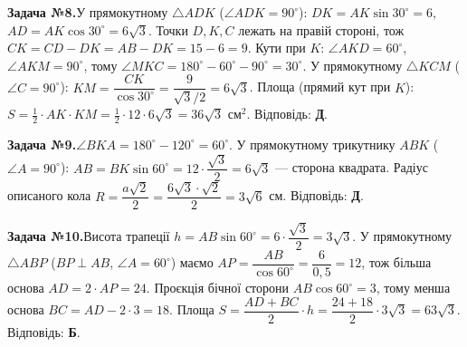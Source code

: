 \documentclass[12pt]{article}
\begin{document}
\par\vspace{0.3cm}\noindent\hypertarget{sol:8}{}
\begin{tcolorbox}[colback=titleBg!40, colframe=mainGreen!55, boxrule=0.4pt, arc=2pt, left=6pt, right=6pt, top=4pt, bottom=4pt, breakable]
\noindent\small\textbf{Задача №8.}\quad У прямокутному $\triangle ADK$ ($\angle ADK=90^\circ$): $DK=AK\sin30^\circ=6$, $AD=AK\cos30^\circ=6\sqrt3$. Точки $D,K,C$ лежать на правій стороні, тож $CK=CD-DK=AB-DK=15-6=9$. Кути при $K$: $\angle AKD=60^\circ$, $\angle AKM=90^\circ$, тому $\angle MKC=180^\circ-60^\circ-90^\circ=30^\circ$. У прямокутному $\triangle KCM$ ($\angle C=90^\circ$): $KM=\dfrac{CK}{\cos30^\circ}=\dfrac{9}{\sqrt3/2}=6\sqrt3$. Площа (прямий кут при $K$): $S=\tfrac12\cdot AK\cdot KM=\tfrac12\cdot12\cdot6\sqrt3=36\sqrt3$ см$^2$. Відповідь: \textbf{Д}.
\par\vspace{0.1cm}\hfill\hyperlink{task:8}{}
\end{tcolorbox}
\par\vspace{0.3cm}\noindent\hypertarget{sol:9}{}
\begin{tcolorbox}[colback=titleBg!40, colframe=mainGreen!55, boxrule=0.4pt, arc=2pt, left=6pt, right=6pt, top=4pt, bottom=4pt, breakable]
\noindent\small\textbf{Задача №9.}\quad $\angle BKA=180^\circ-120^\circ=60^\circ$. У прямокутному трикутнику $ABK$ ($\angle A=90^\circ$): $AB=BK\sin 60^\circ=12\cdot\dfrac{\sqrt3}{2}=6\sqrt3$ --- сторона квадрата. Радіус описаного кола $R=\dfrac{a\sqrt2}{2}=\dfrac{6\sqrt3\cdot\sqrt2}{2}=3\sqrt6$ см. Відповідь: \textbf{Д}.
\par\vspace{0.1cm}\hfill\hyperlink{task:9}{}
\end{tcolorbox}
\par\vspace{0.3cm}\noindent\hypertarget{sol:10}{}
\begin{tcolorbox}[colback=titleBg!40, colframe=mainGreen!55, boxrule=0.4pt, arc=2pt, left=6pt, right=6pt, top=4pt, bottom=4pt, breakable]
\noindent\small\textbf{Задача №10.}\quad Висота трапеції $h=AB\sin60^\circ=6\cdot\dfrac{\sqrt3}{2}=3\sqrt3$. У прямокутному $\triangle ABP$ ($BP\perp AB$, $\angle A=60^\circ$) маємо $AP=\dfrac{AB}{\cos60^\circ}=\dfrac{6}{0{,}5}=12$, тож більша основа $AD=2\cdot AP=24$. Проєкція бічної сторони $AB\cos60^\circ=3$, тому менша основа $BC=AD-2\cdot3=18$. Площа $S=\dfrac{AD+BC}{2}\cdot h=\dfrac{24+18}{2}\cdot3\sqrt3=63\sqrt3$. Відповідь: \textbf{Б}.
\par\vspace{0.1cm}\hfill\hyperlink{task:10}{}
\end{tcolorbox}
\end{document}
